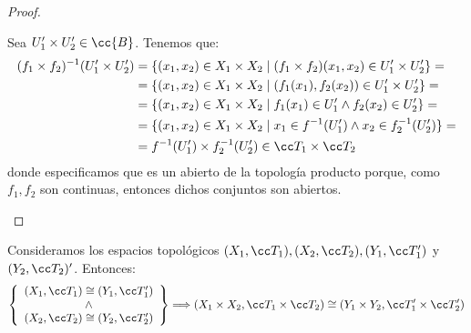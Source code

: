 \begin{proof}
\begin{enumerate}
\begin{description}
            Sea $U_1'\times U_2'\in \cc{B}$. Tenemos que:
            \begin{equation*}
                \begin{split}
                    (f_1\times f_2)^{-1}(U_1'\times U_2')
                    &= \{(x_1,x_2)\in X_1\times X_2\mid (f_1\times f_2)(x_1,x_2)\in U_1'\times U_2'\} =\\
                    &= \{(x_1,x_2)\in X_1\times X_2\mid (f_1(x_1), f_2(x_2))\in U_1'\times U_2'\} =\\
                    &= \{(x_1,x_2)\in X_1\times X_2\mid f_1(x_1) \in U_1' \land f_2(x_2) \in U_2'\} =\\
                    &= \{(x_1,x_2)\in X_1\times X_2\mid x_1 \in f^{-1}(U_1') \land x_2 \in f_2^{-1}(U_2')\} =\\
                    &= f^{-1}(U_1') \times f_2^{-1}(U_2') \in \T_1\times \T_2
                \end{split}
            \end{equation*}
            donde especificamos que es un abierto de la topología producto porque, como $f_1,f_2$ son continuas, entonces dichos conjuntos son abiertos.
        \end{description}

    \end{enumerate}
\end{proof}

\begin{coro}
    Consideramos los espacios topológicos $(X_1,\T_1), (X_2,\T_2), (Y_1,\T_1')$ y $(Y_2, \T_2)'$. Entonces:
    \begin{equation*}
        \left\{\begin{array}{c}
            (X_1, \T_1)\cong (Y_1,\T_1')\\
            \land\\
            (X_2, \T_2)\cong (Y_2,\T_2')\\
        \end{array}\right\} \Longrightarrow (X_1\times X_2, \T_1\times \T_2) \cong (Y_1\times Y_2, \T_1'\times \T_2')
    \end{equation*}
\end{coro}

